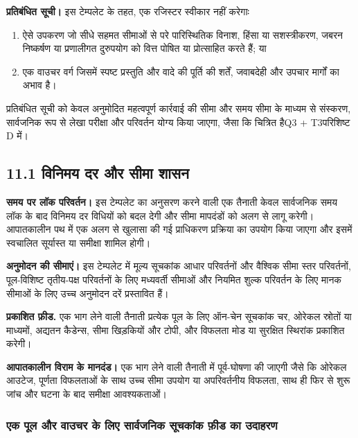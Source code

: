 \documentclass[11pt]{article}
\begin{document}
\textbf{प्रतिबंधित सूची।} इस टेम्पलेट के तहत, एक रजिस्टर स्वीकार नहीं करेगाः

\begin{enumerate}[leftmargin=*]
\item ऐसे उपकरण जो सीधे सहमत सीमाओं से परे पारिस्थितिक विनाश, हिंसा या सशस्त्रीकरण, जबरन निष्कर्षण या प्रणालीगत दुरुपयोग को वित्त पोषित या प्रोत्साहित करते हैं; या
\item एक वाउचर वर्ग जिसमें स्पष्ट प्रस्तुति और वादे की पूर्ति की शर्तें, जवाबदेही और उपचार मार्गों का अभाव है।
\end{enumerate}
प्रतिबंधित सूची को केवल अनुमोदित महत्वपूर्ण कार्रवाई की सीमा और समय सीमा के माध्यम से संस्करण, सार्वजनिक रूप से लेखा परीक्षा और परिवर्तन योग्य किया जाएगा, जैसा कि चित्रित हैQ3 + T3परिशिष्ट D में।

\subsection*{11.1 विनिमय दर और सीमा शासन}

\textbf{समय पर लॉक परिवर्तन।} इस टेम्पलेट का अनुसरण करने वाली एक तैनाती केवल सार्वजनिक समय लॉक के बाद विनिमय दर विधियों को बदल देगी और सीमा मापदंडों को अलग से लागू करेगी। आपातकालीन पथ में एक अलग से खुलासा की गई प्राधिकरण प्रक्रिया का उपयोग किया जाएगा और इसमें स्वचालित सूर्यास्त या समीक्षा शामिल होगी।

\textbf{अनुमोदन की सीमाएं।} इस टेम्पलेट में मूल्य सूचकांक आधार परिवर्तनों और वैश्विक सीमा स्तर परिवर्तनों, पूल-विशिष्ट तृतीय-पक्ष परिवर्तनों के लिए मध्यवर्ती सीमाओं और नियमित शुल्क परिवर्तन के लिए मानक सीमाओं के लिए उच्च अनुमोदन दरें प्रस्तावित हैं।

\textbf{प्रकाशित फ़ीड.} एक भाग लेने वाली तैनाती प्रत्येक पूल के लिए ऑन-चेन सूचकांक चर, ओरेकल स्रोतों या माध्यमों, अद्यतन कैडेन्स, सीमा खिड़कियों और टोपी, और विफलता मोड या सुरक्षित स्थिरांक प्रकाशित करेगी।

\textbf{आपातकालीन विराम के मानदंड।} एक भाग लेने वाली तैनाती में पूर्व-घोषणा की जाएगी जैसे कि ओरेकल आउटेज, पूर्णता विफलताओं के साथ उच्च सीमा उपयोग या अपरिवर्तनीय विफलता, साथ ही फिर से शुरू जांच और घटना के बाद समीक्षा आवश्यकताओं।

\subsubsection*{एक पूल और वाउचर के लिए सार्वजनिक सूचकांक फ़ीड का उदाहरण}
\end{document}
